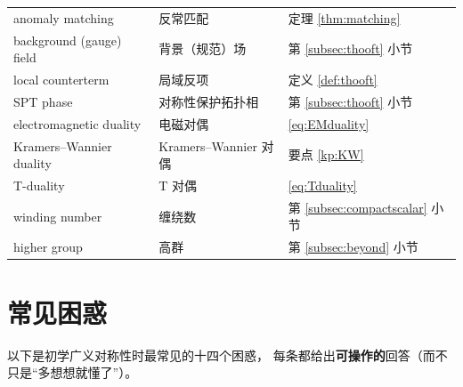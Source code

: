 \documentclass[UTF8,a4paper,11pt]{ctexart}
\theoremstyle{plain}
\theoremstyle{definition}
\theoremstyle{remark}
\begin{document}
\begin{table}[htbp]
\begin{tabular}{@{}lll@{}}
anomaly matching & 反常匹配 & 定理 \ref{thm:matching} \\
background (gauge) field & 背景（规范）场 & 第 \ref{subsec:thooft} 小节 \\
local counterterm & 局域反项 & 定义 \ref{def:thooft} \\
SPT phase & 对称性保护拓扑相 & 第 \ref{subsec:thooft} 小节 \\
electromagnetic duality & 电磁对偶 & \eqref{eq:EMduality} \\
Kramers--Wannier duality & Kramers--Wannier 对偶 & 要点 \ref{kp:KW} \\
T-duality & T 对偶 & \eqref{eq:Tduality} \\
winding number & 缠绕数 & 第 \ref{subsec:compactscalar} 小节 \\
higher group & 高群 & 第 \ref{subsec:beyond} 小节 \\
\bottomrule
\end{tabular}
\end{table}

\section{常见困惑}
\label{sec:confusions}

以下是初学广义对称性时最常见的十四个困惑，
每条都给出\textbf{可操作的}回答（而不只是“多想想就懂了”）。
\end{document}
